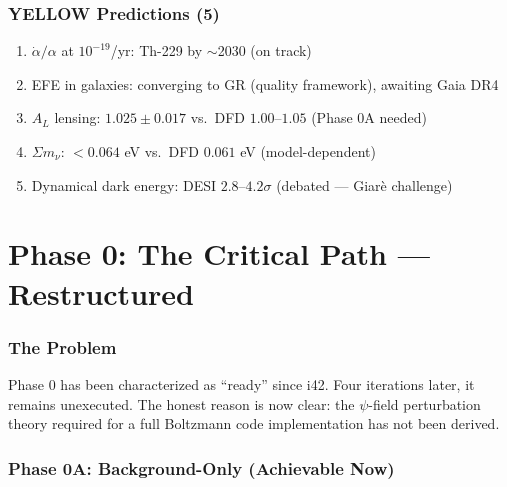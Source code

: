 \documentclass[11pt,a4paper]{article}
\begin{document}
\section{YELLOW Predictions (5)}

\begin{enumerate}
\item $\dot{\alpha}/\alpha$ at $10^{-19}$/yr: Th-229 by $\sim$2030 (on track)
\item EFE in galaxies: converging to GR (quality framework), awaiting Gaia DR4
\item $A_L$ lensing: $1.025 \pm 0.017$ vs.\ DFD $1.00$--$1.05$ (Phase 0A needed)
\item $\Sigma m_\nu$: $< 0.064$ eV vs.\ DFD $0.061$ eV (model-dependent)
\item Dynamical dark energy: DESI $2.8$--$4.2\sigma$ (debated --- Giar\`e challenge)
\end{enumerate}


\part{Phase 0: The Critical Path --- Restructured}

\section{The Problem}

Phase 0 has been characterized as ``ready'' since i42. Four iterations later, it remains unexecuted. The honest reason is now clear: the $\psi$-field perturbation theory required for a full Boltzmann code implementation has not been derived.

\section{Phase 0A: Background-Only (Achievable Now)}
\end{document}
